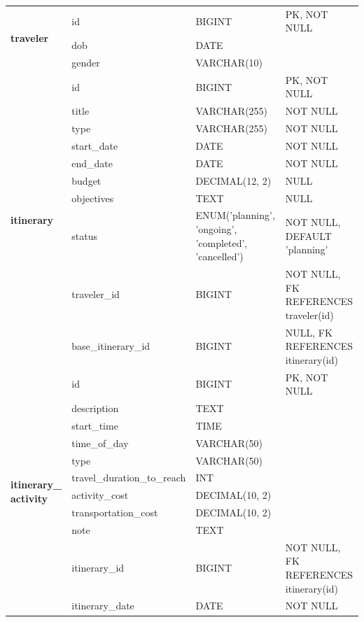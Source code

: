 {\begin{longtable}{|p{2.5cm}|p{3.2cm}|p{4.5cm}|p{4.3cm}|}
\multirow{3}{2.5cm}{\textbf{traveler}} 
    & id & BIGINT & PK, NOT NULL \\ \cline{2-4} 
    & dob & DATE & \\ \cline{2-4} 
    & gender & VARCHAR(10) & \\ \hline

\multirow{10}{2.5cm}{\textbf{itinerary}} 
    & id & BIGINT & PK, NOT NULL \\ \cline{2-4} 
    & title & VARCHAR(255) & NOT NULL \\ \cline{2-4} 
    & type & VARCHAR(255) & NOT NULL \\ \cline{2-4} 
    & start\_date & DATE & NOT NULL \\ \cline{2-4} 
    & end\_date & DATE & NOT NULL \\ \cline{2-4} 
    & budget & DECIMAL(12, 2) & NULL \\ \cline{2-4} 
    & objectives & TEXT & NULL \\ \cline{2-4} 
    & status & ENUM('planning', 'ongoing', 'completed', 'cancelled') & NOT NULL, DEFAULT 'planning' \\ \cline{2-4} 
    & traveler\_id & BIGINT & NOT NULL, FK REFERENCES traveler(id) \\ \cline{2-4} 
    & base\_itinerary\_id & BIGINT & NULL, FK REFERENCES itinerary(id) \\ \hline

\multirow{11}{2.5cm}{\textbf{itinerary\_\newline activity}} 
    & id & BIGINT & PK, NOT NULL \\ \cline{2-4} 
    & description & TEXT & \\ \cline{2-4} 
    & start\_time & TIME & \\ \cline{2-4} 
    & time\_of\_day & VARCHAR(50) & \\ \cline{2-4} 
    & type & VARCHAR(50) & \\ \cline{2-4} 
    & travel\_duration\_\newline to\_reach & INT & \\ \cline{2-4} 
    & activity\_cost & DECIMAL(10, 2) & \\ \cline{2-4} 
    & transportation\_cost & DECIMAL(10, 2) & \\ \cline{2-4} 
    & note & TEXT & \\ \cline{2-4} 
    & itinerary\_id & BIGINT & NOT NULL, FK REFERENCES itinerary(id) \\ \cline{2-4} 
    & itinerary\_date & DATE & NOT NULL \\ \hline


\end{longtable}}
